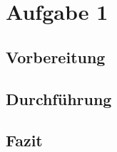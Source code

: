 \section{Aufgabe 1}

	\subsection{Vorbereitung}

	\subsection{Durchführung}

	\subsection{Fazit}

\newpage
